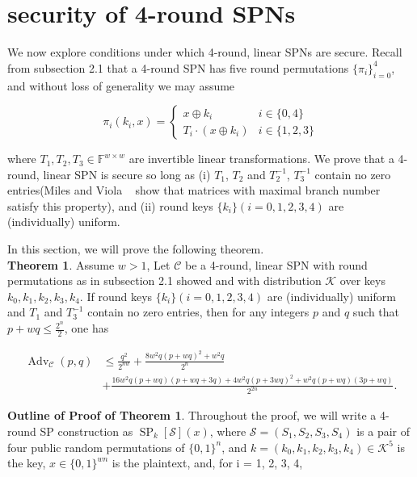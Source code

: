 

\section{security of 4-round SPNs}
\label{section:security of 4-round SPNs}

We now explore conditions under which 4-round, linear SPNs are secure. Recall from subsection 2.1 that a 4-round SPN has five round permutations $\{\pi_i\}_{i=0}^4$, and without loss of generality we may assume

$$
\pi_{i}\left(k_{i}, x\right)=\left\{\begin{array}{ll}
{x \oplus k_{i}} & {i \in\{0,4\}} \\
{T_{i} \cdot\left(x \oplus k_{i}\right)} & {i \in\{1,2,3\}}
\end{array}\right.
$$

where $T_{1}, T_{2}, T_{3} \in \mathbb{F}^{w \times w}$ are invertible linear transformations. We prove that a 4-round, linear SPN is secure so long as (i) $T_1$, $T_2$ and $T_{2}^{-1}$, $T_{3}^{-1}$ contain no zero entries(Miles and Viola ~\cite{miles2015substitution} show that matrices with maximal branch number ~\cite{daemen1995cipher} satisfy this property), and (ii) round keys $\{k_i\}(i=0, 1, 2, 3, 4)$ are (individually) uniform.

In this section, we will prove the following theorem.\\

\noindent
\textbf{Theorem 1}. Assume $w>1$, Let $\mathcal{C}$ be a 4-round, linear SPN with round permutations as in subsection 2.1 showed and with distribution $\mathcal{K}$ over keys $k_{0}, k_{1}, k_{2}, k_{3}, k_{4}$. If round keys $\{k_i\}(i=0, 1, 2, 3, 4)$ are (individually) uniform and $T_1$ and $T_{3}^{-1}$ contain no zero entries, then for any integers $\mathit{p}$ and $\mathit{q}$ such that $p+wq \leq \frac{2^n}{2}$, one has

\begin{equation}
\begin{aligned}
\operatorname{Adv}_{\mathcal{C}}\left(p, q\right) &\leq \frac{q^2}{2^{n w}} + \frac{8 w^2 q(p+wq)^2+w^2 q}{2^n}\\
&+ \frac{16 w^2 q(p+w q)(p+w q +3 q)+4 w^2 q(p+3 wq)^2+ w^2q(p+w q)(3p+w q)}{2^{2 n}}.
\end{aligned}
\end{equation}

\noindent \textbf{Outline of Proof of Theorem 1}. Throughout the proof, we will write a 4-round SP construction as $\operatorname{SP}_{k}[\mathcal{S}](x)$, where $\mathcal{S}=(S_1, S_2, S_3, S_4)$  is a pair of four public random permutations of $\{0,1\}^{n}$, and $k = (k_{0}, k_{1}, k_{2}, k_{3}, k_{4}) \in \mathcal{K}^{5}$ is the key, $x \in \{0,1\}^{w n}$ is the plaintext, and, for i = 1, 2, 3, 4,

